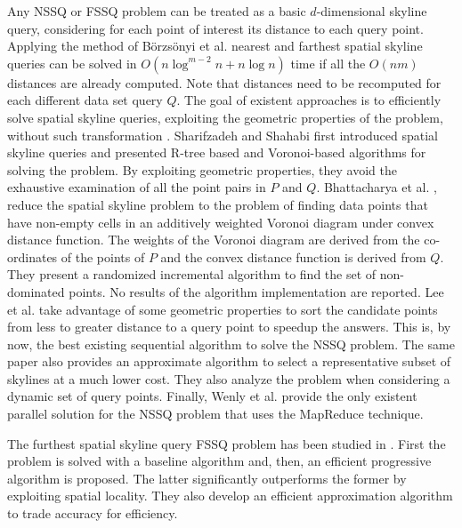 \documentclass[11pt,onecolumn]{elsart3p}
\begin{document}
\vspace{1em}
Any NSSQ or FSSQ problem can be treated as a basic $d$-dimensional skyline query, considering for each point of interest its distance to each query point.
Applying the method of B\"orzs\"onyi et al. \cite{BKS01} nearest and farthest spatial skyline queries can be solved in $O(n \log^{m-2} n + n \log n)$ time if all the $O(nm)$ distances are already computed. Note that distances need to be recomputed for each different data set query $Q$. The goal of existent approaches is to efficiently solve spatial skyline queries, exploiting the
geometric properties of the problem, without such transformation \cite{SS06, SSK09, BBCDKS10, LSAH11, SB13,LZZ13}. Sharifzadeh and Shahabi \cite{SS06,SSK09} first introduced spatial skyline queries and presented R-tree based and Voronoi-based algorithms for solving the problem. By exploiting geometric properties, they avoid the exhaustive examination of all the point pairs in $P$ and $Q$. Bhattacharya et al. \cite{BBCDKS10}, reduce the spatial skyline problem to the problem of finding data points that have non-empty cells in an additively weighted Voronoi diagram under convex distance function. The weights of the Voronoi diagram are derived from the co-ordinates of the points of $P$ and the convex distance function is derived from $Q$. They present a randomized incremental algorithm to find the set of non-dominated points. No results of the algorithm implementation are reported. Lee et al. \cite{LSAH11} take advantage of some geometric properties to sort the candidate points from less to greater distance to a query point to speedup the answers. This is, by now, the best existing sequential algorithm to solve the NSSQ problem. The same paper also provides an approximate algorithm to select a representative subset of skylines at a much lower cost. They also analyze the problem when considering a dynamic set of query points. Finally, Wenly et al. \cite{WZSK17} provide the only existent parallel solution for the NSSQ problem that uses the MapReduce technique.

The furthest spatial skyline query FSSQ problem has been studied in \cite{YLIH13}. First the problem is solved with a baseline algorithm and, then, an efficient progressive algorithm is proposed. The latter significantly outperforms the former by exploiting spatial locality. They also develop an efficient approximation algorithm to trade accuracy for efficiency.
\end{document}
